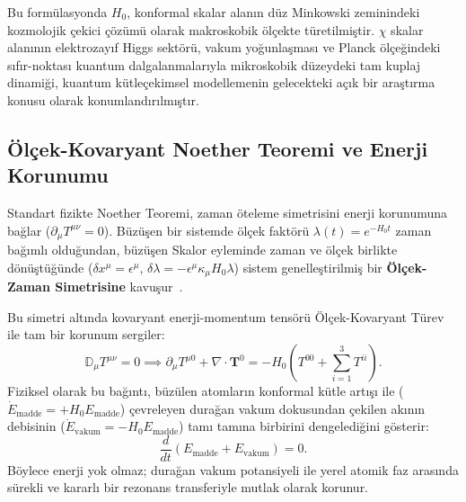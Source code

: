 \begin{remark}
    \label{rem:mikroskobik_dinamik}
    Bu formülasyonda $H_0$, konformal skalar alanın düz Minkowski zeminindeki kozmolojik çekici çözümü olarak makroskobik ölçekte türetilmiştir. $\chi$ skalar alanının elektrozayıf Higgs sektörü, vakum yoğunlaşması ve Planck ölçeğindeki sıfır-noktası kuantum dalgalanmalarıyla mikroskobik düzeydeki tam kuplaj dinamiği, kuantum kütleçekimsel modellemenin gelecekteki açık bir araştırma konusu olarak konumlandırılmıştır.
\end{remark}

\subsection{Ölçek-Kovaryant Noether Teoremi ve Enerji Korunumu}
\label{sec:noether_enerji_main}

Standart fizikte Noether Teoremi, zaman öteleme simetrisini enerji korunumuna bağlar ($\partial_\mu T^{\mu\nu} = 0$). Büzüşen bir sistemde ölçek faktörü $\lambda(t) = e^{-H_0 t}$ zaman bağımlı olduğundan, büzüşen Skalor eyleminde zaman ve ölçek birlikte dönüştüğünde ($\delta x^\mu = \epsilon^\mu$, $\delta\lambda = -\epsilon^\mu \kappa_\mu H_0 \lambda$) sistem genelleştirilmiş bir \textbf{Ölçek-Zaman Simetrisine} kavuşur~\cite{haydari_calculus}.

Bu simetri altında kovaryant enerji-momentum tensörü Ölçek-Kovaryant Türev ile tam bir korunum sergiler:
\begin{equation}
    \mathbb{D}_\mu T^{\mu\nu} = 0 \implies \partial_\mu T^{\mu 0} + \nabla \cdot \mathbf{T}^0 = - H_0 \left( T^{00} + \sum_{i=1}^3 T^{ii} \right).
    \label{eq:kovaryant_korunum_main}
\end{equation}
Fiziksel olarak bu bağıntı, büzülen atomların konformal kütle artışı ile ($\dot{E}_{\mathrm{madde}} = + H_0 E_{\mathrm{madde}}$) çevreleyen durağan vakum dokusundan çekilen akının debisinin ($\dot{E}_{\mathrm{vakum}} = - H_0 E_{\mathrm{madde}}$) tamı tamına birbirini dengelediğini gösterir:
\begin{equation}
    \frac{d}{dt} \left( E_{\mathrm{madde}} + E_{\mathrm{vakum}} \right) = 0.
    \label{eq:toplam_enerji_korunumu}
\end{equation}
Böylece enerji yok olmaz; durağan vakum potansiyeli ile yerel atomik faz arasında sürekli ve kararlı bir rezonans transferiyle mutlak olarak korunur.

